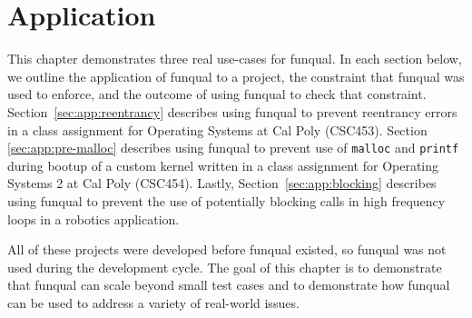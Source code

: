 \chapter{Application}\label{sec:application}

This chapter demonstrates three real use-cases for funqual.  In each section below, we outline the application of funqual to a project, the constraint that funqual was used to enforce, and the outcome of using funqual to check that constraint.  \mbox{Section \ref{sec:app:reentrancy}} describes using funqual to prevent reentrancy errors in a class assignment for Operating Systems at Cal Poly (CSC453).  Section \ref{sec:app:pre-malloc} describes using funqual to prevent use of \lstinline{malloc} and \lstinline{printf} during bootup of a custom kernel written in a class assignment for Operating Systems 2 at Cal Poly (CSC454).  Lastly, \mbox{Section \ref{sec:app:blocking}} describes using funqual to prevent the use of potentially blocking calls in high frequency loops in a robotics application.  

All of these projects were developed before funqual existed, so funqual was not used during the development cycle.  The goal of this chapter is to demonstrate that funqual can scale beyond small test cases and to demonstrate how funqual can be used to address a variety of real-world issues.  






